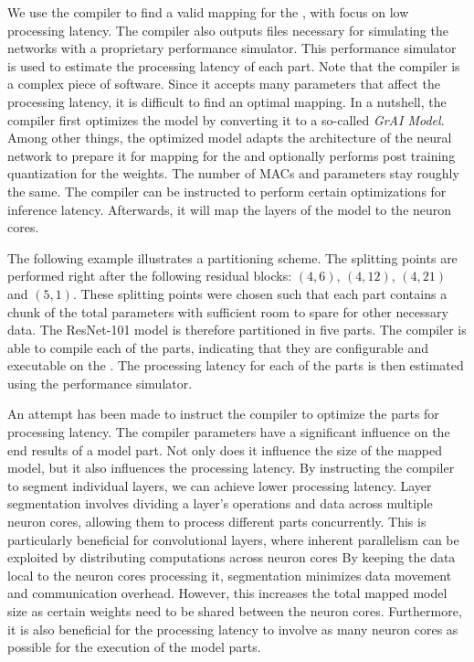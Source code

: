 We use the compiler to find a valid mapping for the \graicore{}, with focus on low processing latency.
The compiler also outputs files necessary for simulating the networks with a proprietary performance simulator.
This performance simulator is used to estimate the processing latency of each part.
Note that the compiler is a complex piece of software.
Since it accepts many parameters that affect the processing latency, it is difficult to find an optimal mapping. 
In a nutshell, the compiler first optimizes the model by converting it to a so-called \textit{GrAI Model}.
Among other things, the optimized model adapts the architecture of the neural network to prepare it for mapping for the \graicore{} and optionally performs post training quantization \autocite{krishnamoorthiQuantizingDeepConvolutional2018} for the weights.
The number of MACs and parameters stay roughly the same.
The compiler can be instructed to perform certain optimizations for inference latency.
Afterwards, it will map the layers of the model to the neuron cores.

The following example illustrates a partitioning scheme.
The splitting points are performed right after the following residual blocks: $(4, 6)$, $(4, 12)$, $(4,21)$ and $(5,1)$.
These splitting points were chosen such that each part contains a chunk of the total parameters with sufficient room to spare for other necessary data.
The ResNet-101 model is therefore partitioned in five parts.
The compiler is able to compile each of the parts, indicating that they are configurable and executable on the \graicore{}.
The processing latency for each of the parts is then estimated using the performance simulator.

An attempt has been made to instruct the compiler to optimize the parts for processing latency.
The compiler parameters have a significant influence on the end results of a model part.
Not only does it influence the size of the mapped model, but it also influences the processing latency.
By instructing the compiler to segment individual layers, we can achieve lower processing latency.
Layer segmentation involves dividing a layer's operations and data across multiple neuron cores, allowing them to process different parts concurrently.
This is particularly beneficial for convolutional layers, where inherent parallelism can be exploited by distributing computations across neuron cores
By keeping the data local to the neuron cores processing it, segmentation minimizes data movement and communication overhead.
However, this increases the total mapped model size as certain weights need to be shared between the neuron cores.
Furthermore, it is also beneficial for the processing latency to involve as many neuron cores as possible for the execution of the model parts.

